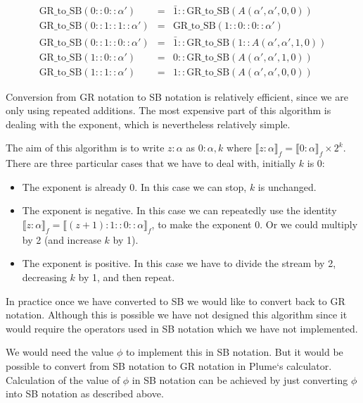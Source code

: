 \documentclass{cs4rep}
\begin{document}
\[ \begin{array}{lcl}
\mbox{GR\_to\_SB}(0::0::\alpha') & = & \bar{1} :: \mbox{GR\_to\_SB}(A(\alpha',\alpha',0,0)) \\
\mbox{GR\_to\_SB}(0::1::1::\alpha') & = & \mbox{GR\_to\_SB}(1::0::0::\alpha') \\
\mbox{GR\_to\_SB}(0::1::0::\alpha') & = & \bar{1} :: \mbox{GR\_to\_SB}(1::A(\alpha',\alpha',1,0)) \\
\mbox{GR\_to\_SB}(1::0::\alpha') & = & 0 :: \mbox{GR\_to\_SB}(A(\alpha',\alpha',1,0)) \\
\mbox{GR\_to\_SB}(1::1::\alpha') & = & 1 :: \mbox{GR\_to\_SB}(A(\alpha',\alpha',0,0))
\end{array} \]

Conversion from GR notation to SB notation is relatively efficient,
since we are only using repeated additions. The most expensive part of
this algorithm is dealing with the exponent, which is nevertheless relatively simple.

The aim of this algorithm is to write $z:\alpha$ as $0:\alpha, k$
where $\llbracket z:\alpha \rrbracket_{f} = \llbracket 0:\alpha
\rrbracket_{f} \times 2^{k}$. There are three particular cases that we
have to deal with, initially $k$ is 0:

\begin{itemize}
\item The exponent is already 0. In this case we can stop, $k$ is unchanged.
\item The exponent is negative. In this case we can repeatedly use the
  identity $\llbracket z:\alpha \rrbracket_{f} = \llbracket
  (z+1):1::0::\alpha \rrbracket_{f}$, to make the exponent 0. Or we
  could multiply by 2 (and increase $k$ by 1).
\item The exponent is positive. In this case we have to divide the
  stream by 2, decreasing $k$ by 1, and then repeat.
\end{itemize}

In practice once we have converted to SB we would like to convert back
to GR notation. Although this is possible we have not designed this
algorithm since it would require the operators used in SB notation
which we have not implemented.

We would need the value $\phi$ to implement this in SB notation.  But
it would be possible to convert from SB notation to GR notation in
Plume`s calculator. Calculation of the value of $\phi$ in SB notation
can be achieved by just converting $\phi$ into SB notation as
described above.
\end{document}
